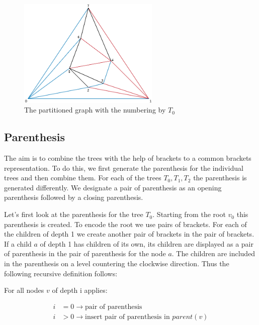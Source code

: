 \documentclass[a4paper]{scrartcl}
\begin{document}
\begin{figure}[h]
	\centering
	\includegraphics[width=0.6\textwidth]{img/exampleTraversal}
	\caption{The partitioned graph with the numbering by $T_0$}
	\label{fig:exampleTraversal}
\end{figure}




\subsection{Parenthesis}
The aim is to combine the trees with the help of brackets to a common brackets representation. To do this, we first generate the parenthesis for the individual trees and then combine them. For each of the trees $T_0,T_1,T_2$ the parenthesis is generated differently. We designate a pair of parenthesis as an opening parenthesis followed by a closing parenthesis.

Let's first look at the parenthesis for the tree $T_0$. Starting from the root $v_0$ this parenthesis is created. To encode the root we use pairs of brackets. For each of the children of depth 1 we create another pair of brackets in the pair of brackets. If a child $a$ of depth 1 has children of its own, its children are displayed as a pair of parenthesis in the pair of parenthesis for the node $a$. The children are included in the parenthesis on a level countering the clockwise direction. Thus the following recursive definition follows:

For all nodes $v$ of depth i applies:



\begin{equation}
\begin{split}
 i & =0 \rightarrow \text{pair of parenthesis}\\
i & >0 \rightarrow \text{insert pair of parenthesis in } parent(v)
\end{split}
\end{equation}
\end{document}
